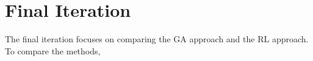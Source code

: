 \section{Final Iteration}
The final iteration focuses on comparing the GA approach and the RL approach. To compare the methods, 